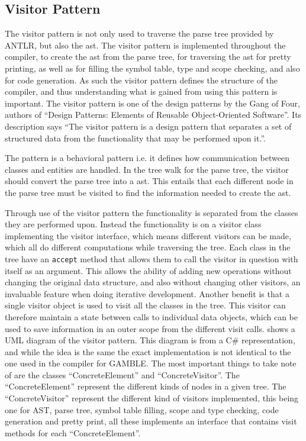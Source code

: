 \subsection*{Visitor Pattern}\label{subs:visit}
The visitor pattern is not only used to traverse the parse tree provided by ANTLR, but also the \acrfull{ast}.
The visitor pattern is implemented throughout the compiler, to create the \acrfull{ast} from the parse tree, for traversing the \acrfull{ast} for pretty printing, as well as for filling the symbol table, type and scope checking, and also for code generation.
As such the visitor pattern defines the structure of the compiler, and thus understanding what is gained from using this pattern is important.
The visitor pattern is one of the design patterns by the Gang of Four, authors of ``Design Patterns: Elements of Reusable Object-Oriented Software''.
Its description says ``The visitor pattern is a design pattern that separates a set of structured data from the functionality that may be performed upon it.''. \citep{GOF}

The pattern is a behavioral pattern i.e. it defines how communication between classes and entities are handled.
In the tree walk for the parse tree, the visitor should convert the parse tree into a \acrfull{ast}.
This entails that each different node in the parse tree must be visited to find the information needed to create the \acrfull{ast}.

Through use of the visitor pattern the functionality is separated from the classes they are performed upon. 
Instead the functionality is on a visitor class implementing the visitor interface, which means different visitors can be made, which all do different computations while traversing the tree.
Each class in the tree have an \texttt{accept} method that allows them to call the visitor in question with itself as an argument.
This allows the ability of adding new operations without changing the original data structure, and also without changing other visitors, an invaluable feature when doing iterative development.
Another benefit is that a single visitor object is used to visit all the classes in the tree.
This visitor can therefore maintain a state between calls to individual data objects, which can be used to save information in an outer scope from the different visit calls.
 shows a UML diagram of the visitor pattern.
This diagram is from a C\# representation, and while the idea is the same the exact implementation is not identical to the one used in the compiler for GAMBLE.
The most important things to take note of are the classes ``ConcreteElement'' and ``ConcreteVisitor''.
The ``ConcreteElement'' represent the different kinds of nodes in a given tree.
The ``ConcreteVisitor'' represent the different kind of visitors implemented, this being one for AST, parse tree, symbol table filling, scope and type checking, code generation and pretty print, all these implements an interface that contains visit methods for each ``ConcreteElement''.

